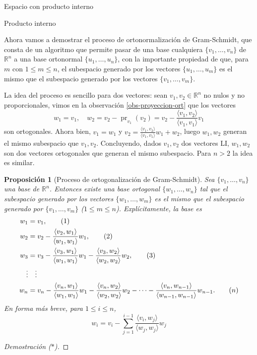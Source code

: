 \documentclass[a4paper,12pt,twoside,spanish]{amsbook}
\newtheorem{proposicion}[teorema]{Proposici\'on}
\theoremstyle{definition}
\theoremstyle{remark}
\newcommand{\la}{\langle}
\newcommand{\ra}{\rangle}
\newcommand{\R}{\mathbb R}
\begin{document}
\begin{chapter}{Espacio con producto interno}
\begin{section}{Producto interno}
		
		\medskip
		
		Ahora vamos a demostrar el proceso de ortonormalización de Gram-Schmidt, que consta de  un algoritmo que permite pasar de una base cualquiera $\{v_1,\ldots, v_n\}$ de $\R^n$ a una base ortonormal $\{u_1,\ldots, u_n\}$, con la importante propiedad de que, para $m$ con  $1 \le m \le n$, el subespacio generado por los vectores $\{u_1,\ldots, u_m\}$ es el mismo que el subespacio generado por los vectores $\{v_1,\ldots, v_m\}$.
		
	
		
		\medskip 
		
		La idea del proceso es sencillo para dos vectores: sean  $v_1,v_2 \in \R^n$ no  nulos y no proporcionales, vimos en la observación \ref{obs-proyeccion-ort} que  los vectores
		\begin{equation*}
			w_1 = v_1, \quad w_2 = v_2 - \operatorname{pr}_{v_1}(v_2) = v_2 - \frac{\la v_1,v_2\ra}{\la v_1,v_1\ra}v_1
		\end{equation*}
		son ortogonales. Ahora bien, $v_1 = w_1$ y $v_2  = \frac{\la v_1,v_2\ra}{\la v_1,v_1\ra}w_1 + w_2$, luego  $w_1,w_2$ generan el mismo subespacio que $v_1,v_2$. Concluyendo, dados  $v_1,v_2$ dos vectores LI, $w_1,w_2$ son dos vectores ortogonales que generan el mismo subespacio. Para $n >2$ la idea es similar. 
		
		\medskip 
		
		
		
		\begin{proposicion}[Proceso de ortogonalización de Gram-Schmidt]
			Sea $\{v_1,\ldots,v_n\}$ una base de $\R^n$. Entonces existe una base ortogonal $\{w_1,\ldots, w_n\}$ tal que el subespacio generado por los vectores $\{w_1,\ldots, w_m\}$ es el mismo que el subespacio generado por $\{v_1,\ldots, v_m\}$ ($1\le m \le n$). Explícitamente, la base es
			\begin{align}
			w_1 &= v_1, \tag{1} \\
			w_2 &= v_2 - \frac{\la v_2,w_1\ra}{\la w_1,w_1\ra}w_1, \tag{2}\\
			w_3 &= v_3 - \frac{\la v_3,w_1\ra}{\la w_1,w_1\ra}w_1- \frac{\la v_3,w_2\ra}{\la w_2,w_2\ra}w_2,\tag{3} \\
			\vdots &\quad \vdots \notag \\
			w_n &= v_n - \frac{\la v_n,w_1\ra}{\la w_1,w_1\ra}w_1- \frac{\la v_n,w_2\ra}{\la w_2,w_2\ra}w_2 - \cdots - \frac{\la v_n,w_{n-1}\ra}{\la w_{n-1},w_{n-1}\ra}w_{n-1}.\tag{$n$}	
			\end{align}
			En forma más breve, para $1 \le i \le n$, 
			\begin{equation}
			w_i = v_i - \sum_{j = 1}^{i-1} \frac{\la v_i,w_{j}\ra}{\la w_{j},w_{j}\ra}w_{j} \tag{$i$}
			\end{equation}
		\end{proposicion} 
		\begin{proof}[Demostración ($*$)]
			

\end{proof}
\end{section}
\end{chapter}
\end{document}
